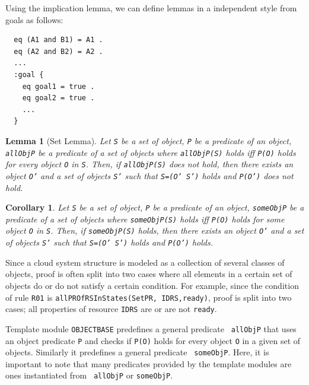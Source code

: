 \documentclass[12pt]{report}
\newtheorem{lemma}{Lemma}
\newtheorem{corollary}{Corollary}
\newcommand{\stt}[1]{{\small{\tt {#1}}}}
\begin{document}
Using the implication lemma, we can define lemmas in a independent
style from goals as follows:
\small
\begin{verbatim}
  eq (A1 and B1) = A1 .
  eq (A2 and B2) = A2 .
  ...
  :goal {
    eq goal1 = true .
    eq goal2 = true .
    ...
  }
\end{verbatim}
\normalsize

\begin{lemma}[Set Lemma]
Let {\tt S} be a set of object, {\tt P} be a predicate of an object,
{\tt allObjP} be a predicate of a set of objects where
\stt{allObjP(S)} holds iff \stt{P(O)} holds for every object {\tt O}
in {\tt S}. Then, if \stt{allObjP(S)} does not hold, then there exists
an object {\tt O'} and a set of objects {\tt S'} such that \stt{S=(O'
  S')} holds and \stt{P(O')} does not hold.
\end{lemma}
\begin{corollary}
Let {\tt S} be a set of object, {\tt P} be a predicate of an object,
{\tt someObjP} be a predicate of a set of objects where
\stt{someObjP(S)} holds iff \stt{P(O)} holds for some object {\tt O}
in {\tt S}. Then, if \stt{someObjP(S)} holds, then there exists an
object {\tt O'} and a set of objects {\tt S'} such that \stt{S=(O'
  S')} holds and \stt{P(O')} holds.
\end{corollary}
Since a cloud system structure is modeled as a collection of several
classes of objects, proof is often split into two cases where all
elements in a certain set of objects do or do not satisfy a certain
condition.  For example, since the condition of rule {\tt R01} is 
\stt{allPROfRSInStates(SetPR, IDRS,ready)}, proof is split into two
cases; all properties of resource {\tt IDRS} are or are not
{\tt ready}.

Template module {\tt OBJECTBASE} predefines a general predicate {\tt
  allObjP} that uses an object predicate {\tt P} and checks if
\stt{P(O)} holds for every object {\tt O} in a given set of
objects. Similarly it predefines a general predicate {\tt
  someObjP}. Here, it is important to note that many predicates
provided by the template modules are ones instantiated from {\tt
  allObjP} or {\tt someObjP}.
\end{document}
